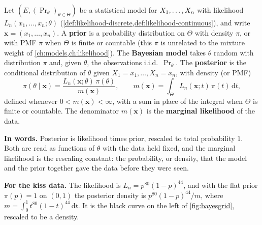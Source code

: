 \begin{definition}
\label{def:posterior}
Let $(E, (\Pr_\theta)_{\theta \in \Theta})$ be a statistical model for $X_1, \ldots, X_n$ with likelihood $L_n(x_1, \ldots, x_n; \theta)$ (\cref{def:likelihood-discrete,def:likelihood-continuous}), and write $\mathbf{x} = (x_1, \ldots, x_n)$. A \textbf{prior} is a probability distribution on $\Theta$ with density $\pi$, or with PMF $\pi$ when $\Theta$ is finite or countable (this $\pi$ is unrelated to the mixture weight of \cref{ch:models,ch:likelihood}). The \textbf{Bayesian model} takes $\theta$ random with distribution $\pi$ and, given $\theta$, the observations i.i.d.\ $\Pr_\theta$. The \textbf{posterior} is the conditional distribution of $\theta$ given $X_1 = x_1, \ldots, X_n = x_n$, with density (or PMF)
\[
\pi(\theta \mid \mathbf{x}) = \frac{L_n(\mathbf{x}; \theta)\,\pi(\theta)}{m(\mathbf{x})}, \qquad m(\mathbf{x}) = \int_\Theta L_n(\mathbf{x}; t)\,\pi(t)\,\mathrm{d}t,
\]
defined whenever $0 < m(\mathbf{x}) < \infty$, with a sum in place of the integral when $\Theta$ is finite or countable. The denominator $m(\mathbf{x})$ is the \textbf{marginal likelihood} of the data.
\end{definition}

\begin{inwords}
\textbf{In words.} Posterior is likelihood times prior, rescaled to total probability $1$. Both are read as functions of $\theta$ with the data held fixed, and the marginal likelihood is the rescaling constant: the probability, or density, that the model and the prior together gave the data before they were seen.
\par\smallskip
\textbf{For the kiss data.} The likelihood is $L_n = p^{80}(1 - p)^{44}$, and with the flat prior $\pi(p) = 1$ on $(0, 1)$ the posterior density is $p^{80}(1 - p)^{44}/m$, where $m = \int_0^1 t^{80}(1 - t)^{44}\,\mathrm{d}t$. It is the black curve on the left of \cref{fig:bayesgrid}, rescaled to be a density.
\end{inwords}

